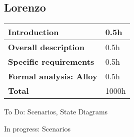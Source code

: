 \subsection*{Lorenzo}
\begin{table}[h]
    \begin{tabular}{|l|l|}
        \toprule
        \textbf{Introduction}           & 0.5h  \\ \midrule
        \textbf{Overall description}    & 0.5h  \\ \midrule
        \textbf{Specific requirements}  & 0.5h  \\ \midrule
        \textbf{Formal analysis: Alloy} & 0.5h  \\ \midrule
        \textbf{Total}                  & 1000h \\ \bottomrule
    \end{tabular}
\end{table}
To Do: Scenarios, State Diagrams

In progress: Scenarios
